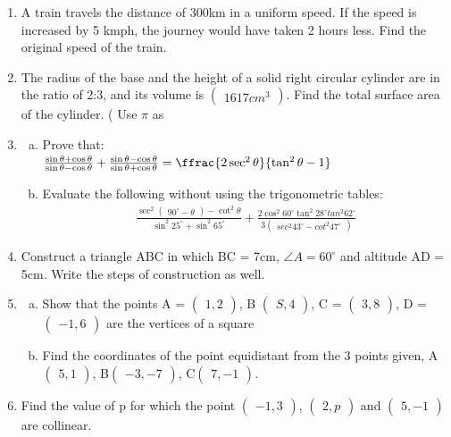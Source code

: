 \documentclass[journal,12pt,twocolumn]{IEEEtran}
\newcommand{\myvec}[1]{\ensuremath{\begin{pmatrix}#1\end{pmatrix}}}
\begin{document}
\begin{enumerate}[label=1.\arabic*]
\begin{enumerate}[label=2.\arabic*]
\item A train travels the distance of 300km in a uniform speed. If the speed
is increased by 5 kmph, the journey would have taken 2 hours less. Find the 
original speed of the train.\\
\item The radius of the base and the height of a solid right circular cylinder
are in the ratio of 2:3, and its volume is $\myvec{1617 cm^3}$. Find the total 
surface area of the cylinder. ( Use $\pi$  as %
\item 
\begin{enumerate}[a)] 
    \item  Prove that:\\
     $ \frac{\sin{\theta} + \cos{\theta}}{\sin{\theta} - \cos{\theta}}  + \frac{\sin{\theta} - \cos{\theta}}{\sin{\theta} + \cos{\theta}} = \ffrac{2 \sec^2 \theta}{\tan^2 \theta - 1} $\\
     \item Evaluate the following without using the trigonometric tables:\\
     \begin{align}
     \frac{\sec^2\myvec{90^\circ - \theta} - \cot^2\theta}{\sin^2 25^\circ + \sin^2 65^\circ}
     + \frac{2\cos^2 60^\circ \tan^2 28^\circ tan^2 62^\circ}{3\myvec{sec^2 43^\circ - cot^2 47^\circ}}
     \end{align}
\end{enumerate}

\item Construct a triangle ABC in which BC = 7cm, $\angle{A} = 60^\circ $  and altitude AD = 5cm. Write the steps of construction as well.\\

\item \begin{enumerate}[a)] 
    \item Show that the points A = \myvec{1,2}, B \myvec{S,4}, C = \myvec{3,8}, D = \myvec{-1,6} are the vertices of a square\\
    \item Find the coordinates of the point equidistant from the 3 points given, A\myvec{5,1}, B\myvec{-3, -7}, C\myvec{7,-1}.\\
\end{enumerate}
\item Find the value of p for which the point \myvec{-1,3}, \myvec{2,p} and \myvec{5,-1} are collinear. \\


\end{enumerate}
\end{enumerate}
\end{document}
